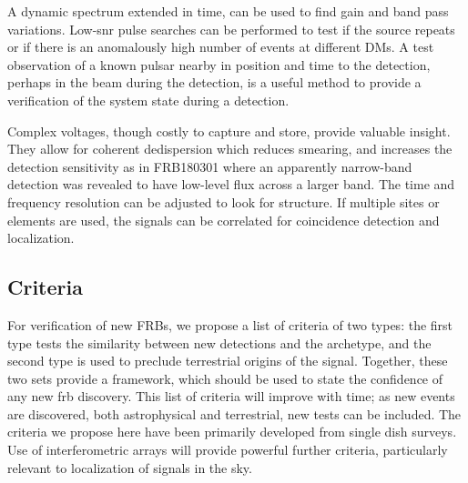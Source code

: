 \documentclass[a4paper,fleqn,usenatbib]{mnras}
\begin{document}
A dynamic spectrum extended in time, can be used to find gain and band pass
variations. Low-\gls{snr} pulse searches can be performed to test if the source
repeats or if there is an anomalously high number of events at different DMs.  A
test observation of a known pulsar nearby in position and time to the detection,
perhaps in the beam during the detection, is a useful method to provide a
verification of the system state during a detection.

Complex voltages, though costly to capture and store, provide valuable insight.
They allow for coherent dedispersion which reduces smearing, and increases the
detection sensitivity as in FRB180301 \citep{atel11376} where an apparently
narrow-band detection was revealed to have low-level flux across a larger band.
The time and frequency resolution can be adjusted to look for structure. If
multiple sites or elements are used, the signals can be correlated for
coincidence detection and localization.


\subsection{Criteria}
\label{sec:criteria}

For verification of new FRBs, we propose a list of criteria of two types: the
first type tests the similarity between new detections and the archetype, and the
second type is used to preclude terrestrial origins of the signal. Together,
these two sets provide a framework, which should be used to state the confidence
of any new \gls{frb} discovery. This list of criteria will improve with time; as
new events are discovered, both astrophysical and terrestrial, new tests can be
included. The criteria we propose here have been primarily developed from single
dish surveys.  Use of interferometric arrays will provide powerful further
criteria, particularly relevant to localization of signals in the sky.
\end{document}
